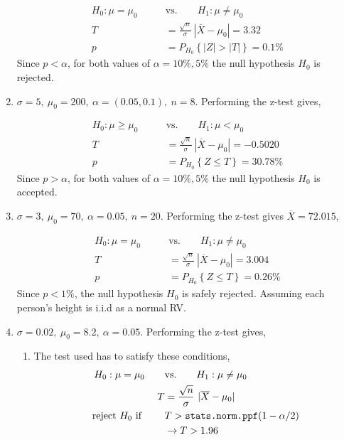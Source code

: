 \begin{enumerate}
		\begin{align}
			H_0 : \mu = \mu_0 \qquad &\text{vs.} \qquad H_1 : \mu \neq \mu_0 \nonumber \\
			T &= \frac{\sqrt{n}}{\sigma}\ |\overline{X} - \mu_0| = 3.32 \nonumber \\
			p &= P_{H_0}\left\{|Z| > |T|\right\} = 0.1\% 
		\end{align}
		Since $ p < \alpha $,  for both values of $ \alpha = 10\%, 5\% $ the null hypothesis $ H_0 $ is rejected.
	
	
	\item $ \sigma = 5,\ \mu_0 = 200,\ \alpha = (0.05, 0.1),\ n = 8$. Performing the z-test gives,
	
		\begin{align}
			H_0 : \mu \geq \mu_0 \qquad &\text{vs.} \qquad H_1 : \mu < \mu_0 \nonumber \\
			T &= \frac{\sqrt{n}}{\sigma}\ |\overline{X} - \mu_0| = -0.5020 \nonumber \\
			p &= P_{H_0}\left\{Z \leq T\right\} = 30.78\% 
		\end{align}
		Since $ p > \alpha $,  for both values of $ \alpha = 10\%, 5\% $ the null hypothesis $ H_0 $ is accepted.
	
	
	\item $ \sigma = 3,\ \mu_0 = 70,\ \alpha = 0.05,\ n = 20$. Performing the z-test gives $ \overline{X} = 72.015 $,
	
		\begin{align}
			H_0 : \mu = \mu_0 \qquad &\text{vs.} \qquad H_1 : \mu \neq \mu_0 \nonumber \\
			T &= \frac{\sqrt{n}}{\sigma}\ |\overline{X} - \mu_0| = 3.004 \nonumber \\
			p &= P_{H_0}\left\{Z \leq T\right\} = 0.26\% 
		\end{align}
		Since $ p < 1\% $, the null hypothesis $ H_0 $ is safely rejected. Assuming each person's height is i.i.d as a normal RV.
	
	
	\item $ \sigma = 0.02,\ \mu_0 = 8.2,\ \alpha = 0.05$. Performing the z-test gives,
	
		\begin{enumerate}
			\item The test used has to satisfy these conditions,
			\begin{align}
				H_0 : \mu = \mu_0 \qquad &\text{vs.} \qquad H_1 : \mu \neq \mu_0 \nonumber \\
				T &= \frac{\sqrt{n}}{\sigma}\ |\overline{X} - \mu_0| \nonumber \\
				\text{reject $ H_0 $ if } \qquad & T > \texttt{stats.norm.ppf}(1-\alpha/2) \nonumber \\
				&\to T > 1.96
			\end{align}
			

\end{enumerate}
\end{enumerate}
